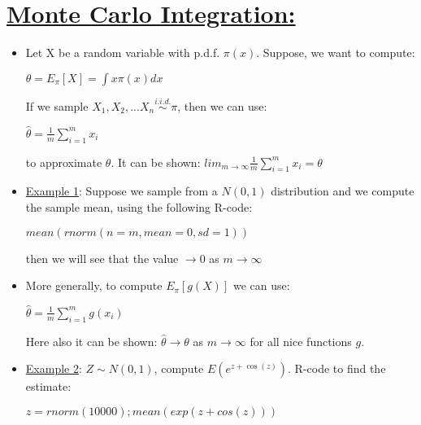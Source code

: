 \documentclass[12pt]{article}
\begin{document}
\section{\underline{Monte Carlo Integration:}}
\begin{itemize}
\item Let X be a random variable with p.d.f. $\pi(x)$. Suppose, we want to compute:
\begin{center}
$\theta = E_{\pi}[X] = \int x \pi(x) dx$
\end{center}
If we sample $X_1, X_2, ... X_n \stackrel{i.i.d.}{\sim} \pi$, then we can use:
\begin{center}
$\hat{\theta} = \frac{1}{m} \sum_{i=1}^m x_i$
\end{center}
to approximate $\theta$.
It can be shown: $lim_{m \rightarrow \infty} \frac{1}{m} \sum_{i=1}^m x_i = \theta$
\item \underline{Example 1}: Suppose we sample from a $N(0,1)$ distribution and we compute the sample mean, using the following R-code:
 \begin{center}
$mean(rnorm(n=m, mean = 0, sd =1))$
\end{center}
then we will see that the value $\rightarrow 0$ as $m \rightarrow \infty$
\item More generally, to compute $E_{\pi}[g(X)]$ we can use: 
\begin{center}
$\hat{\theta} = \frac{1}{m} \sum_{i=1}^m g(x_i)$
\end{center}
Here also it can be shown: $\hat{\theta} \rightarrow \theta$ as $m \rightarrow \infty$ for all nice functions $g$.
\item \underline{Example 2}: $Z \sim N(0,1)$, compute $E(e^{z + \cos(z)})$. R-code to find the estimate:
\begin{center}
$z=rnorm(10000); mean(exp(z + cos(z)))$
\end{center}
\end{itemize}
\end{document}
